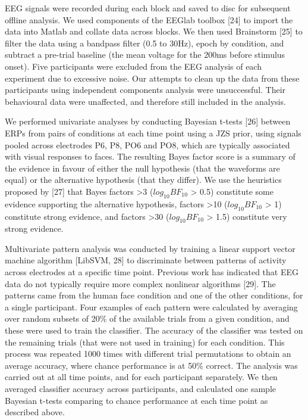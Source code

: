 \documentclass[
]{article}
\begin{document}
EEG signals were recorded during each block and saved to disc for subsequent offline analysis. We used components of the EEGlab toolbox {[}24{]} to import the data into Matlab and collate data across blocks. We then used Brainstorm {[}25{]} to filter the data using a bandpass filter (0.5 to 30Hz), epoch by condition, and subtract a pre-trial baseline (the mean voltage for the 200ms before stimulus onset). Five participants were excluded from the EEG analysis of each experiment due to excessive noise. Our attempts to clean up the data from these participants using independent components analysis were unsuccessful. Their behavioural data were unaffected, and therefore still included in the analysis.

We performed univariate analyses by conducting Bayesian t-tests {[}26{]} between ERPs from pairs of conditions at each time point using a JZS prior, using signals pooled across electrodes P6, P8, PO6 and PO8, which are typically associated with visual responses to faces. The resulting Bayes factor score is a summary of the evidence in favour of either the null hypothesis (that the waveforms are equal) or the alternative hypothesis (that they differ). We use the heuristics proposed by {[}27{]} that Bayes factors \textgreater3 (\(log_{10}BF_{10}\) \textgreater{} 0.5) constitute some evidence supporting the alternative hypothesis, factors \textgreater10 (\(log_{10}BF_{10}\) \textgreater{} 1) constitute strong evidence, and factors \textgreater30 (\(log_{10}BF_{10}\) \textgreater{} 1.5) constitute very strong evidence.

Multivariate pattern analysis was conducted by training a linear support vector machine algorithm {[}LibSVM, 28{]} to discriminate between patterns of activity across electrodes at a specific time point. Previous work has indicated that EEG data do not typically require more complex nonlinear algorithms {[}29{]}. The patterns came from the human face condition and one of the other conditions, for a single participant. Four examples of each pattern were calculated by averaging over random subsets of 20\% of the available trials from a given condition, and these were used to train the classifier. The accuracy of the classifier was tested on the remaining trials (that were not used in training) for each condition. This process was repeated 1000 times with different trial permutations to obtain an average accuracy, where chance performance is at 50\% correct. The analysis was carried out at all time points, and for each participant separately. We then averaged classifier accuracy across participants, and calculated one sample Bayesian t-tests comparing to chance performance at each time point as described above.
\end{document}
